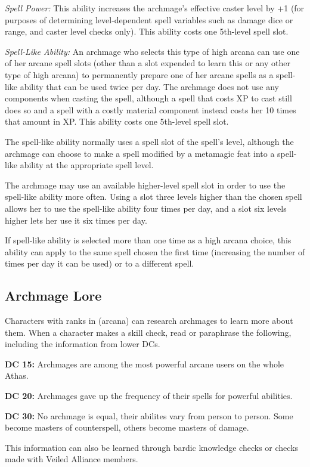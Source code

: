 \textit{Spell Power:} This ability increases the archmage's effective caster level by +1 (for purposes of determining level-dependent spell variables such as damage dice or range, and caster level checks only). This ability costs one 5th-level spell slot.

\textit{Spell-Like Ability:} An archmage who selects this type of high arcana can use one of her arcane spell slots (other than a slot expended to learn this or any other type of high arcana) to permanently prepare one of her arcane spells as a spell-like ability that can be used twice per day. The archmage does not use any components when casting the spell, although a spell that costs XP to cast still does so and a spell with a costly material component instead costs her 10 times that amount in XP. This ability costs one 5th-level spell slot.

The spell-like ability normally uses a spell slot of the spell's level, although the archmage can choose to make a spell modified by a metamagic feat into a spell-like ability at the appropriate spell level.

The archmage may use an available higher-level spell slot in order to use the spell-like ability more often. Using a slot three levels higher than the chosen spell allows her to use the spell-like ability four times per day, and a slot six levels higher lets her use it six times per day.

If spell-like ability is selected more than one time as a high arcana choice, this ability can apply to the same spell chosen the first time (increasing the number of times per day it can be used) or to a different spell.

\subsection{Archmage Lore}
Characters with ranks in  (arcana) can research archmages to learn more about them. When a character makes a skill check, read or paraphrase the following, including the information from lower DCs.

\textbf{DC 15:} Archmages are among the most powerful arcane users on the whole Athas.

\textbf{DC 20:} Archmages gave up the frequency of their spells for powerful abilities.

\textbf{DC 30:} No archmage is equal, their abilites vary from person to person. Some become masters of counterspell, others become masters of damage.

This information can also be learned through bardic knowledge checks or  checks made with Veiled Alliance members.